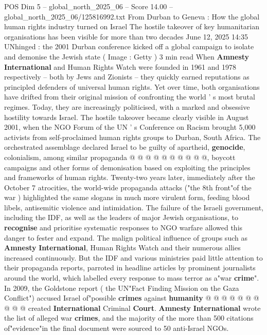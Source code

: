 \begin{textsample}{POS Dim 5 – global\_north\_2025\_06 – Score 14.00 – global\_north\_2025\_06/125816992.txt}  \label{ex:f5_pos_085}
From Durban to Geneva : How the global human rights industry turned on Israel The hostile takeover of key humanitarian organisations has been visible for more than two decades June 12, 2025 14:35 UNhinged : the 2001 Durban conference kicked off a global campaign to isolate and demonise the Jewish state ( Image : Getty ) 3 min read When \textbf{Amnesty} \textbf{International} and Human Rights Watch were founded in 1961 and 1978 respectively -- both by Jews and Zionists -- they quickly earned reputations as principled defenders of universal human rights.
Yet over time, both organisations have drifted from their original mission of confronting the world ' s most brutal regimes.
Today, they are increasingly politicised, with a marked and obsessive hostility towards Israel.
The hostile takeover became clearly visible in August 2001, when the NGO Forum of the UN ' s Conference on Racism brought 5,000 activists from self-proclaimed human rights groups to Durban, South Africa.
The orchestrated assemblage declared Israel to be guilty of apartheid, \textbf{genocide}, colonialism, among similar propaganda @ @ @ @ @ @ @ @ @ @, boycott campaigns and other forms of demonisation based on exploiting the principles and frameworks of human rights.
Twenty-two years later, immediately after the October 7 atrocities, the world-wide propaganda attacks ("the 8th front"of the war ) highlighted the same slogans in much more virulent form, feeding blood libels, antisemitic violence and intimidation.
The failure of the Israeli government, including the IDF, as well as the leaders of major Jewish organisations, to \textbf{recognise} and prioritise systematic responses to NGO warfare allowed this danger to fester and expand.
The malign political influence of groups such as \textbf{Amnesty} \textbf{International}, Human Rights Watch and their numerous allies increased continuously.
But the IDF and various ministries paid little attention to their propaganda reports, parroted in headline articles by prominent journalists around the world, which labelled every response to mass terror as a"war \textbf{crime}".
In 2009, the Goldstone report ( the UN"Fact Finding Mission on the Gaza Conflict") accused Israel of"possible \textbf{crimes} against \textbf{humanity} @ @ @ @ @ @ @ @ @ @ created \textbf{International} Criminal \textbf{Court}. \textbf{Amnesty} \textbf{International} wrote the list of alleged war \textbf{crimes}, and the majority of the more than 500 citations of"evidence"in the final document were sourced to 50 anti-Israel NGOs.

\end{textsample}
